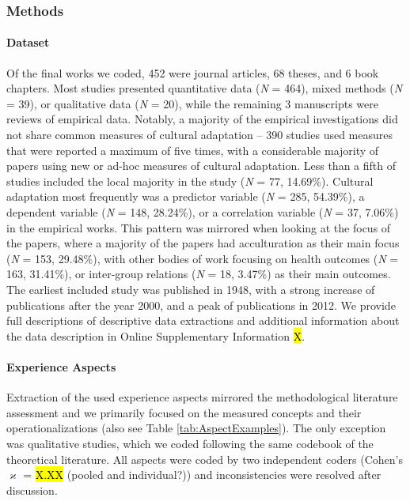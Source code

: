

\subsubsection{Methods}

\paragraph{Dataset}

Of the final works we coded, 452 were journal articles, 68 theses, and 6
book chapters. Most studies presented quantitative data (\textit{N} =
464), mixed methods (\textit{N} = 39), or qualitative data (\textit{N} =
20), while the remaining 3 manuscripts were reviews of empirical data.
Notably, a majority of the empirical investigations did not share common
measures of cultural adaptation -- 390 studies used measures that were
reported a maximum of five times, with a considerable majority of papers
using new or ad-hoc measures of cultural adaptation. Less than a fifth
of studies included the local majority in the study (\textit{N} = 77,
14.69\%). Cultural adaptation most frequently was a predictor variable
(\textit{N} = 285, 54.39\%), a dependent variable (\textit{N} = 148,
28.24\%), or a correlation variable (\textit{N} = 37, 7.06\%) in the
empirical works. This pattern was mirrored when looking at the focus of
the papers, where a majority of the papers had acculturation as their
main focus (\textit{N} = 153, 29.48\%), with other bodies of work
focusing on health outcomes (\textit{N} = 163, 31.41\%), or inter-group
relations (\textit{N} = 18, 3.47\%) as their main outcomes. The earliest
included study was published in 1948, with a strong increase of
publications after the year 2000, and a peak of publications in 2012. We
provide full descriptions of descriptive data extractions and additional
information about the data description in Online Supplementary
Information \hl{X}.

\paragraph{Experience Aspects}

Extraction of the used experience aspects mirrored the methodological
literature assessment and we primarily focused on the measured concepts
and their operationalizations (also see Table \ref{tab:AspectExamples}).
The only exception was qualitative studies, which we coded following the
same codebook of the theoretical literature. All aspects were coded by
two independent coders (Cohen's \(\varkappa\) = \hl{X.XX} (pooled and
individual?)) and inconsistencies were resolved after discussion.

